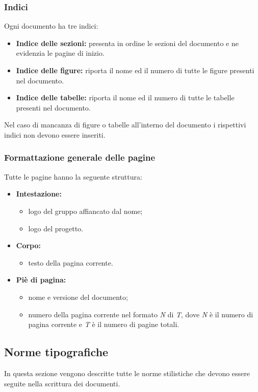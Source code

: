 \subsubsection{Indici}
Ogni documento ha tre indici: 
\begin{itemize}
	\item \textbf{Indice delle sezioni:} presenta in ordine le sezioni del documento e ne evidenzia le pagine di inizio.
	\item \textbf{Indice delle figure:} riporta il nome ed il numero di tutte le figure presenti nel documento.
	\item \textbf{Indice delle tabelle:} riporta il nome ed il numero di tutte le tabelle presenti nel documento.
\end{itemize}
Nel caso di mancanza di figure o tabelle all'interno del documento i rispettivi indici non devono essere inseriti.

\subsubsection{Formattazione generale delle pagine}
Tutte le pagine hanno la seguente struttura:
\begin{itemize}
	\item \textbf{Intestazione:}
	\begin{itemize}
		\item logo del gruppo affiancato dal nome;
		\item logo del progetto.
	\end{itemize}
		\item \textbf{Corpo:}
		\begin{itemize}
			\item testo della pagina corrente.
		\end{itemize}
	\item \textbf{Piè di pagina:}
	\begin{itemize}
		\item nome e versione del documento;
		\item numero della pagina corrente nel formato \textit{N} di \textit{T}, dove \textit{N} è il numero di pagina corrente e \textit{T} è il numero di pagine totali.
	\end{itemize}
\end{itemize}

\subsection{Norme tipografiche}
In questa sezione vengono descritte tutte le norme stilistiche che devono essere seguite nella scrittura dei documenti. 

